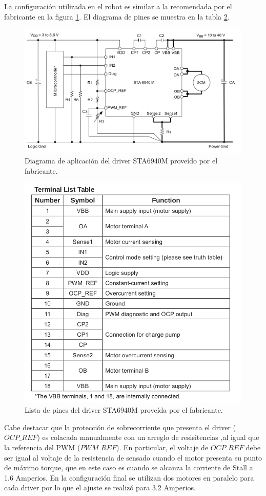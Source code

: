 La configuración utilizada en el robot es similar a la recomendada por el fabricante en la figura \ref{imagen:DriverAplicacion}. El diagrama de pines se muestra en la tabla \ref{imagen:DriverTabla}.

\begin{figure}[H]
	\centering		\includegraphics[width=0.7\linewidth]{imagenes/prototipo/InformacionDeAplicacion}
	\caption{Diagrama de aplicación del driver STA6940M proveído por el fabricante.}
	\label{imagen:DriverAplicacion}
\end{figure}


\begin{figure}[H]
	\centering		\includegraphics[width=0.7\linewidth]{imagenes/prototipo/TablaDePines}
	\caption{Lista de pines del driver STA6940M proveída por el fabricante. }
	\label{imagen:DriverTabla}
\end{figure}

Cabe destacar que la protección de sobrecorriente que presenta el driver ($OCP\_ REF$) es colacada manualmente con un arreglo de resisitencias ,al igual que la referencia del PWM ($PWM\_ REF$). En particular, el voltaje de $OCP\_ REF$ debe ser igual al voltaje de la resistencia de sensado cuando el motor presenta su punto de máximo torque, que en este caso es cuando se alcanza la corriente de Stall a 1.6 Amperios. En la configuración final se utilizan dos motores en paralelo para cada driver por lo que el ajuste se realizó para 3.2 Amperios.


